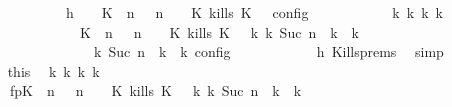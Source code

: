 \begin{isabellebody}
\ \ \ \ \ \ \isamarkupfalse%
\ {\isacharminus}\isanewline
\ \ \ \ \ \ \ \ \isamarkupfalse%
\ h{}{\isacharcolon}\ {\isacartoucheopen}{\isasymrho}\ {\isasymin}\ {\isasymlbrakk}\ {\isacharparenleft}{\isacharparenleft}K\ {\isasymnot}{\isasymUp}\ n{\isacharparenright}\ {\isacharhash}\ {\isasymGamma}{\isacharparenright}{\isacharcomma}\ n\ {\isasymturnstile}\ {\isasymPsi}\ {\isasymtriangleright}\ {\isacharparenleft}{\isacharparenleft}K\ kills\ K\ {\isacharhash}\ {\isasymPhi}{\isacharparenright}\ {\isasymrbrakk}\isactrlsub c\isactrlsub o\isactrlsub n\isactrlsub f\isactrlsub i\isactrlsub g{\isacartoucheclose}\isanewline
\ \ \ \ \ \ \ \ \isamarkupfalse%
\ \isamarkupfalse%
\ {\isacartoucheopen}{\isasymexists}{\isasymGamma}\isactrlsub k\ {\isasymPsi}\isactrlsub k\ {\isasymPhi}\isactrlsub k\ k{\isachardot}\isanewline
\ \ \ \ \ \ \ \ \ \ \ \ \ \ \ \ \ \ \ \ {\isacharparenleft}{\isacharparenleft}{\isacharparenleft}{\isacharparenleft}K\ {\isasymnot}{\isasymUp}\ n{\isacharparenright}\ {\isacharhash}\ {\isasymGamma}{\isacharparenright}{\isacharcomma}\ n\ {\isasymturnstile}\ {\isasymPsi}\ {\isasymtriangleright}\ {\isacharparenleft}{\isacharparenleft}K\ kills\ K\ {\isacharhash}\ {\isasymPhi}{\isacharparenright}{\isacharparenright}\ {\isasymhookrightarrow}\isactrlbsup k\isactrlesup \ {\isacharparenleft}{\isasymGamma}\isactrlsub k{\isacharcomma}\ Suc\ n\ {\isasymturnstile}\ {\isasymPsi}\isactrlsub k\ {\isasymtriangleright}\ {\isasymPhi}\isactrlsub k{\isacharparenright}{\isacharparenright}\isanewline
\ \ \ \ \ \ \ \ \ \ \ \ \ \ \ \ \ \ {\isasymand}\ {\isasymrho}\ {\isasymin}\ {\isasymlbrakk}\ {\isasymGamma}\isactrlsub k{\isacharcomma}\ Suc\ n\ {\isasymturnstile}\ {\isasymPsi}\isactrlsub k\ {\isasymtriangleright}\ {\isasymPhi}\isactrlsub k\ {\isasymrbrakk}\isactrlsub c\isactrlsub o\isactrlsub n\isactrlsub f\isactrlsub i\isactrlsub g{\isacartoucheclose}\isanewline
\ \ \ \ \ \ \ \ \ \ \isamarkupfalse%
\ h{}\ Kills{\isachardot}prems\ \isamarkupfalse%
\ simp\isanewline
\ \ \ \ \ \ \ \ \isamarkupfalse%
\ this\ \isamarkupfalse%
\ {\isasymGamma}\isactrlsub k\ {\isasymPsi}\isactrlsub k\ {\isasymPhi}\isactrlsub k\ k\ \isanewline
\ \ \ \ \ \ \ \ \ \ fp{\isacharcolon}{\isacartoucheopen}{\isacharparenleft}{\isacharparenleft}{\isacharparenleft}{\isacharparenleft}K\ {\isasymnot}{\isasymUp}\ n{\isacharparenright}\ {\isacharhash}\ {\isasymGamma}{\isacharparenright}{\isacharcomma}\ n\ {\isasymturnstile}\ {\isasymPsi}\ {\isasymtriangleright}\ {\isacharparenleft}{\isacharparenleft}K\ kills\ K\ {\isacharhash}\ {\isasymPhi}{\isacharparenright}{\isacharparenright}\ {\isasymhookrightarrow}\isactrlbsup k\isactrlesup \ {\isacharparenleft}{\isasymGamma}\isactrlsub k{\isacharcomma}\ Suc\ n\ {\isasymturnstile}\ {\isasymPsi}\isactrlsub k\ {\isasymtriangleright}\ {\isasymPhi}\isactrlsub k{\isacharparenright}{\isacharparenright}{\isacartoucheclose}\isanewline

\end{isabellebody}
